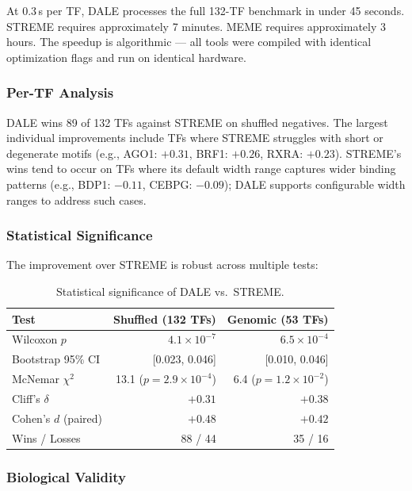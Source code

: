 \documentclass[11pt,a4paper]{article}
\begin{document}
At 0.3\,s per TF, DALE processes the full 132-TF benchmark in under 45 seconds. STREME requires approximately 7 minutes. MEME requires approximately 3 hours. The speedup is algorithmic --- all tools were compiled with identical optimization flags and run on identical hardware.

\subsubsection{Per-TF Analysis}

DALE wins 89 of 132 TFs against STREME on shuffled negatives. The largest individual improvements include TFs where STREME struggles with short or degenerate motifs (e.g., AGO1: $+0.31$, BRF1: $+0.26$, RXRA: $+0.23$). STREME's wins tend to occur on TFs where its default width range captures wider binding patterns (e.g., BDP1: $-0.11$, CEBPG: $-0.09$); DALE supports configurable width ranges to address such cases.

\subsubsection{Statistical Significance}

The improvement over STREME is robust across multiple tests:

\begin{table}[H]
\centering
\caption{Statistical significance of DALE vs.\ STREME.}
\label{tab:stats}
\small
\begin{tabular}{lrr}
\toprule
Test & Shuffled (132 TFs) & Genomic (53 TFs) \\
\midrule
Wilcoxon $p$         & $4.1 \times 10^{-7}$ & $6.5 \times 10^{-4}$ \\
Bootstrap 95\% CI    & [0.023, 0.046]       & [0.010, 0.046] \\
McNemar $\chi^2$     & 13.1 ($p = 2.9 \times 10^{-4}$) & 6.4 ($p = 1.2 \times 10^{-2}$) \\
Cliff's $\delta$     & $+0.31$              & $+0.38$ \\
Cohen's $d$ (paired) & $+0.48$              & $+0.42$ \\
Wins / Losses        & 88 / 44              & 35 / 16 \\
\bottomrule
\end{tabular}
\end{table}

\subsubsection{Biological Validity}
\end{document}
